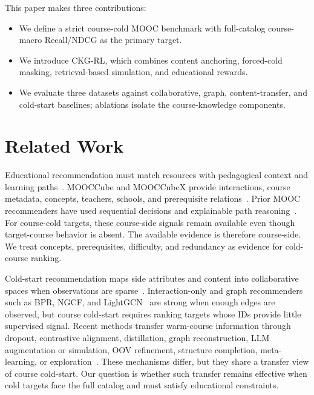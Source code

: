 \documentclass[letterpaper]{article}
\begin{document}
This paper makes three contributions:
\begin{itemize}
    \item We define a strict course-cold MOOC benchmark with full-catalog course-macro Recall/NDCG as the primary target.
    \item We introduce CKG-RL, which combines content anchoring, forced-cold masking, retrieval-based simulation, and educational rewards.
    \item We evaluate three datasets against collaborative, graph, content-transfer, and cold-start baselines; ablations isolate the course-knowledge components.
\end{itemize}

\section{Related Work}
Educational recommendation must match resources with pedagogical context and learning paths~\cite{dasilva2023educationalrs,rahayu2023learningpath}. MOOCCube and MOOCCubeX provide interactions, course metadata, concepts, teachers, schools, and prerequisite relations~\cite{yu2020mooccube,wang2021mooccubex}. Prior MOOC recommenders have used sequential decisions and explainable path reasoning~\cite{zhang2019hrlcourse,dessi2024findingpaths}. For course-cold targets, these course-side signals remain available even though target-course behavior is absent. The available evidence is therefore course-side. We treat concepts, prerequisites, difficulty, and redundancy as evidence for cold-course ranking.

Cold-start recommendation maps side attributes and content into collaborative spaces when observations are sparse~\cite{schein2002coldstart,gantner2010attribute,liu2024once,wu2024llmrec,zhang2025coldstartllm}. Interaction-only and graph recommenders such as BPR, NGCF, and LightGCN~\cite{rendle2009bpr,wang2019ngcf,he2020lightgcn} are strong when enough edges are observed, but course cold-start requires ranking targets whose IDs provide little supervised signal. Recent methods transfer warm-course information through dropout, contrastive alignment, distillation, graph reconstruction, LLM augmentation or simulation, OOV refinement, structure completion, meta-learning, or exploration~\cite{volkovs2017dropoutnet,zhou2023ccfcrec,huang2023aldi,kim2024cgrc,wang2024llmaugmenter,huang2025coldllm,zhao2024usim,zhao2025fsgnn,luo2025pam,jiang2025itemcentric}. These mechanisms differ, but they share a transfer view of course cold-start. Our question is whether such transfer remains effective when cold targets face the full catalog and must satisfy educational constraints.
\end{document}
